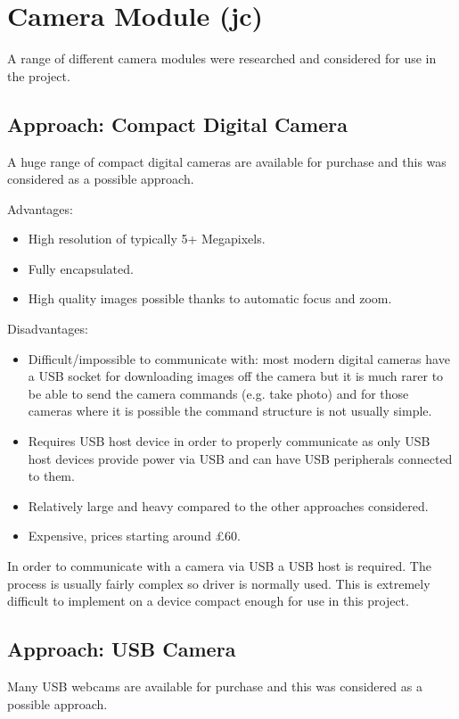 \section{Camera Module (jc)}
\label{sec:John_options}

A range of different camera modules were researched and considered for use in the project.

\subsection{Approach: Compact Digital Camera}
\label{sec:Compact_option}
A huge range of compact digital cameras are available for purchase and this was considered as a possible approach.

Advantages:
      \begin{itemize}
         \item High resolution of typically 5+ Megapixels.
		 \item Fully encapsulated.
		 \item High quality images possible thanks to automatic focus and zoom.
     \end{itemize}

Disadvantages:
     \begin{itemize}
        \item Difficult/impossible to communicate with: most modern digital cameras have a USB socket for downloading images off the camera but it is much rarer to be able to send the camera commands (e.g. take photo) and for those cameras where it is possible the command structure is not usually simple.
        \item Requires USB host device in order to properly communicate as only USB host devices provide power via USB and can have USB peripherals connected to them.
	\item Relatively large and heavy compared to the other approaches considered.
	\item Expensive, prices starting around \pounds 60.
     \end{itemize}

In order to communicate with a camera via USB a USB host is required. The process is usually fairly complex so driver is normally used. This is extremely difficult to implement on a device compact enough for use in this project.

\subsection{Approach: USB Camera}
\label{sec:USB_option}
Many USB webcams are available for purchase and this was considered as a possible approach.

